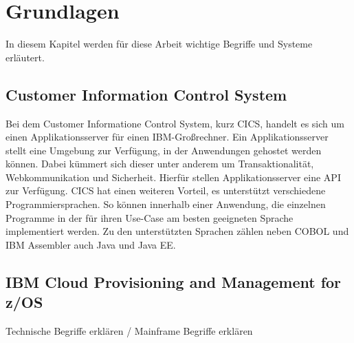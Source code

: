 \chapter{Grundlagen}\label{ch:grundlagen}
In diesem Kapitel werden für diese Arbeit wichtige Begriffe und Systeme erläutert.

\section{Customer Information Control System}\label{cics}
Bei dem Customer Informatione Control System, kurz CICS, handelt es sich um einen Applikationsserver für einen IBM-Großrechner.
Ein Applikationsserver stellt eine Umgebung zur Verfügung, in der Anwendungen gehostet werden können.
Dabei kümmert sich dieser unter anderem um Transaktionalität, Webkommunikation und Sicherheit.
Hierfür stellen Applikationsserver eine API zur Verfügung.
CICS hat einen weiteren Vorteil, es unterstützt verschiedene Programmiersprachen.
So können innerhalb einer Anwendung, die einzelnen Programme in der für ihren Use-Case am besten geeigneten Sprache implementiert werden.
Zu den unterstützten Sprachen zählen neben COBOL und IBM Assembler auch Java und Java EE.
 


\cite{Rayns.2011}

\section{IBM Cloud Provisioning and Management for z/OS}\label{sec:zosmf}

Technische Begriffe erklären / Mainframe Begriffe erklären

